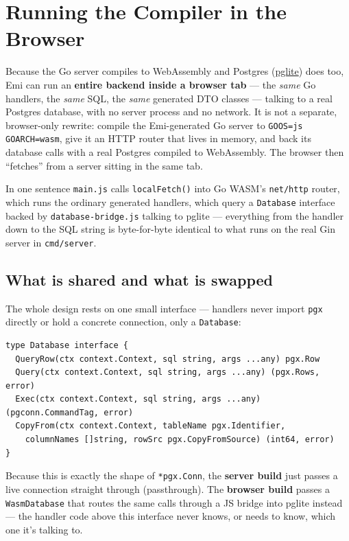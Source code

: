 \section{Running the Compiler in the Browser}
\label{sec:in-browser}

Because the Go server compiles to WebAssembly and Postgres
(\href{https://pglite.dev}{pglite}) does too, Emi can run an
\textbf{entire backend inside a browser tab} --- the \emph{same} Go
handlers, the \emph{same} SQL, the \emph{same} generated DTO classes ---
talking to a real Postgres database, with no server process and no
network. It is not a separate, browser-only rewrite: compile the
Emi-generated Go server to \texttt{GOOS=js GOARCH=wasm}, give it an HTTP
router that lives in memory, and back its database calls with a real
Postgres compiled to WebAssembly. The browser then ``fetches'' from a
server sitting in the same tab.

\begin{sidebar}{In one sentence}
\texttt{main.js} calls \texttt{localFetch()} into Go WASM's
\texttt{net/http} router, which runs the ordinary generated handlers,
which query a \texttt{Database} interface backed by
\texttt{database-bridge.js} talking to pglite --- everything from the
handler down to the SQL string is byte-for-byte identical to what runs
on the real Gin server in \texttt{cmd/server}.
\end{sidebar}

\subsection{What is shared and what is swapped}
The whole design rests on one small interface --- handlers never import
\texttt{pgx} directly or hold a concrete connection, only a
\texttt{Database}:
\begin{lstlisting}
type Database interface {
  QueryRow(ctx context.Context, sql string, args ...any) pgx.Row
  Query(ctx context.Context, sql string, args ...any) (pgx.Rows, error)
  Exec(ctx context.Context, sql string, args ...any) (pgconn.CommandTag, error)
  CopyFrom(ctx context.Context, tableName pgx.Identifier,
    columnNames []string, rowSrc pgx.CopyFromSource) (int64, error)
}
\end{lstlisting}
Because this is exactly the shape of \texttt{*pgx.Conn}, the
\textbf{server build} just passes a live connection straight through
(passthrough). The \textbf{browser build} passes a \texttt{WasmDatabase}
that routes the same calls through a JS bridge into pglite instead ---
the handler code above this interface never knows, or needs to know,
which one it's talking to.

